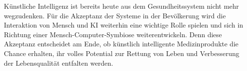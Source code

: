 Künstliche Intelligenz ist bereits heute aus dem Gesundheitssystem nicht mehr wegzudenken. Für die Akzeptanz der Systeme in der Bevölkerung wird die Interaktion von Mensch und KI weiterhin eine wichtige Rolle spielen und sich in Richtung einer Mensch-Computer-Symbiose weiterentwickeln. 
Denn diese Akzeptanz entscheidet am Ende, ob künstlich intelligente Medizinprodukte die Chance erhalten, ihr volles Potential zur Rettung von Leben und Verbesserung der Lebensqualität entfalten werden. 
